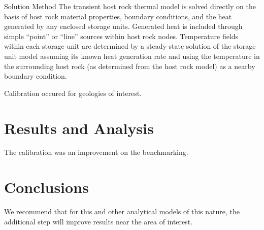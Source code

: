 \documentclass{anstrans}
\begin{document}





Solution Method
The transient host rock thermal model is solved directly on the basis of host 
rock material properties, boundary conditions, and the heat generated by any 
enclosed storage units. Generated heat is included through simple “point” or 
“line” sources within host rock nodes.  Temperature fields within each storage 
unit are determined by a steady-state solution of the storage unit model 
assuming its known heat generation rate and using the temperature in the 
surrounding host rock (as determined from the host rock model) as a nearby 
boundary condition. 

Calibration occured for geologies of interest.  


\section{Results and Analysis}





The calibration was an improvement on the benchmarking.

\section{Conclusions}

We recommend that for this and other analytical models of this nature, the 
additional step will improve results near the area of interest.



\end{document}
